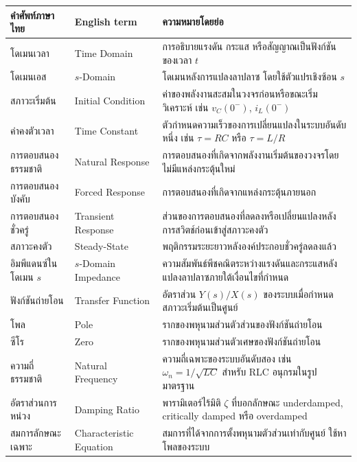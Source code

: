 \begin{table}[htbp]
    \centering
    \begin{tabularx}{\textwidth}{L{0.22\textwidth} L{0.22\textwidth} Y}
        \hline
        \textbf{คำศัพท์ภาษาไทย} & \textbf{English term} & \textbf{ความหมายโดยย่อ} \\
        \hline
        โดเมนเวลา & Time Domain & การอธิบายแรงดัน กระแส หรือสัญญาณเป็นฟังก์ชันของเวลา $t$ \\
        โดเมนเอส & $s$-Domain & โดเมนหลังการแปลงลาปลาซ โดยใช้ตัวแปรเชิงซ้อน $s$ \\
        สภาวะเริ่มต้น & Initial Condition & ค่าของพลังงานสะสมในวงจรก่อนหรือขณะเริ่มวิเคราะห์ เช่น $v_C(0^-)$, $i_L(0^-)$ \\
        ค่าคงตัวเวลา & Time Constant & ตัวกำหนดความเร็วของการเปลี่ยนแปลงในระบบอันดับหนึ่ง เช่น $\tau=RC$ หรือ $\tau=L/R$ \\
        การตอบสนองธรรมชาติ & Natural Response & การตอบสนองที่เกิดจากพลังงานเริ่มต้นของวงจรโดยไม่มีแหล่งกระตุ้นใหม่ \\
        การตอบสนองบังคับ & Forced Response & การตอบสนองที่เกิดจากแหล่งกระตุ้นภายนอก \\
        การตอบสนองชั่วครู่ & Transient Response & ส่วนของการตอบสนองที่ลดลงหรือเปลี่ยนแปลงหลังการสวิตช์ก่อนเข้าสู่สภาวะคงตัว \\
        สภาวะคงตัว & Steady-State & พฤติกรรมระยะยาวหลังองค์ประกอบชั่วครู่ลดลงแล้ว \\
        อิมพีแดนซ์ในโดเมน $s$ & $s$-Domain Impedance & ความสัมพันธ์พีชคณิตระหว่างแรงดันและกระแสหลังแปลงลาปลาซภายใต้เงื่อนไขที่กำหนด \\
        ฟังก์ชันถ่ายโอน & Transfer Function & อัตราส่วน $Y(s)/X(s)$ ของระบบเมื่อกำหนดสภาวะเริ่มต้นเป็นศูนย์ \\
        โพล & Pole & รากของพหุนามส่วนตัวส่วนของฟังก์ชันถ่ายโอน \\
        ซีโร & Zero & รากของพหุนามส่วนตัวเศษของฟังก์ชันถ่ายโอน \\
        ความถี่ธรรมชาติ & Natural Frequency & ความถี่เฉพาะของระบบอันดับสอง เช่น $\omega_n=1/\sqrt{LC}$ สำหรับ RLC อนุกรมในรูปมาตรฐาน \\
        อัตราส่วนการหน่วง & Damping Ratio & พารามิเตอร์ไร้มิติ $\zeta$ ที่บอกลักษณะ underdamped, critically damped หรือ overdamped \\
        สมการลักษณะเฉพาะ & Characteristic Equation & สมการที่ได้จากการตั้งพหุนามตัวส่วนเท่ากับศูนย์ ใช้หาโพลของระบบ \\
        \hline
    \end{tabularx}
\end{table}

